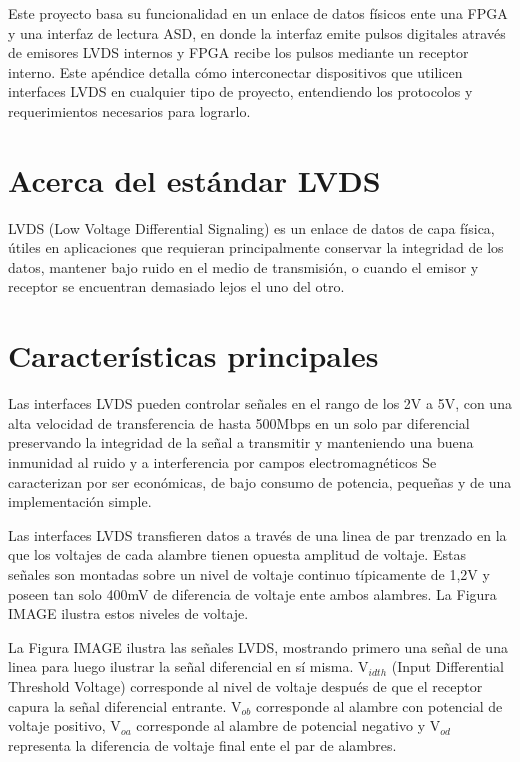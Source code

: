 Este proyecto basa su funcionalidad en un enlace de datos físicos ente una FPGA y una interfaz de lectura ASD, en donde la interfaz emite pulsos digitales através de emisores LVDS internos y FPGA recibe los pulsos mediante un receptor interno. Este apéndice detalla cómo interconectar dispositivos que utilicen interfaces LVDS en cualquier tipo de proyecto, entendiendo los protocolos y requerimientos necesarios para lograrlo.

\section{Acerca del estándar LVDS}	
	LVDS (Low Voltage Differential Signaling) es un enlace de datos de capa física, útiles en aplicaciones que requieran principalmente conservar la integridad de los datos, mantener bajo ruido en el medio de transmisión, o cuando el emisor y receptor se encuentran demasiado lejos el uno del otro.
	
\section{Características principales}
	
	Las interfaces LVDS pueden controlar señales en el rango de los 2V a 5V, con una alta velocidad de transferencia de hasta 500Mbps en un solo par diferencial preservando la integridad de la señal a transmitir y manteniendo una buena inmunidad al ruido y a interferencia por campos electromagnéticos Se caracterizan por ser económicas, de bajo consumo de potencia, pequeñas y de una implementación simple.

	Las interfaces LVDS transfieren datos a través de una linea de par trenzado en la que los voltajes de cada alambre tienen opuesta amplitud de voltaje. Estas señales son montadas sobre un nivel de voltaje continuo típicamente de 1,2V y poseen tan solo 400mV de diferencia de voltaje ente ambos alambres. La Figura IMAGE ilustra estos niveles de voltaje.
	
	La Figura IMAGE ilustra las señales LVDS, mostrando primero una señal de una linea para luego ilustrar la señal diferencial en sí misma. V$_{idth}$ (Input Differential Threshold Voltage) corresponde al nivel de voltaje después de que el receptor capura la señal diferencial entrante.  V$_{ob}$ corresponde al alambre con potencial de voltaje positivo,  V$_{oa}$ corresponde al alambre de potencial negativo y  V$_{od}$ representa la diferencia de voltaje final ente el par de alambres.
	
